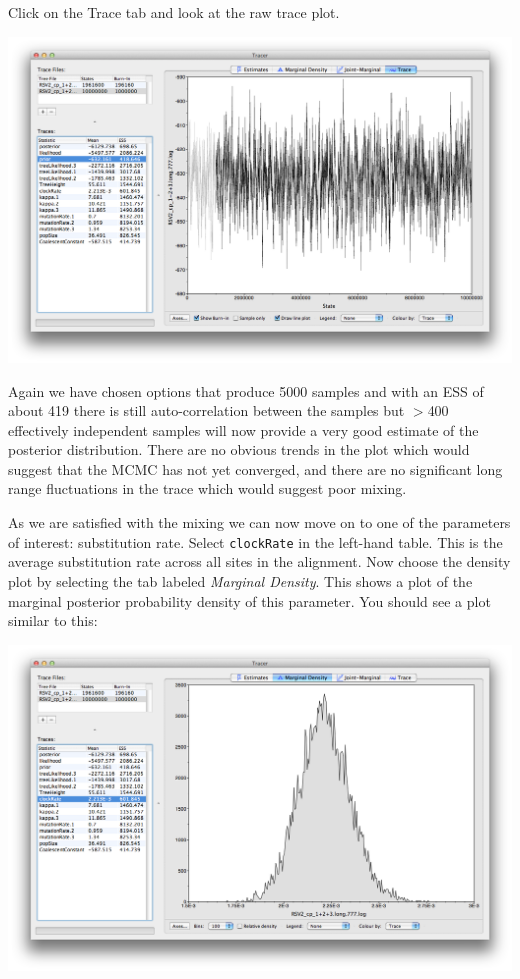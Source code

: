 \documentclass[12pt]{article}
\begin{document}
Click on the Trace tab and look at the raw trace plot.

\medskip{}

\includegraphics[width=\textwidth]{figures/Tracer2}

\medskip{}

Again we have chosen options that produce 5000 samples and with an ESS of about 419 there is still auto-correlation
between the samples but $>$400 effectively independent samples will now provide a very good estimate of the posterior distribution.
There are no obvious trends in the plot which would suggest that the MCMC has not yet converged, and there are no significant long range 
fluctuations in the trace which would suggest poor mixing.

As we are satisfied with the mixing we can now move on to one of the parameters of interest:
substitution rate. Select \texttt{clockRate} in the left-hand table. This is the average substitution rate across all sites in the
alignment. Now choose the density plot by selecting the tab labeled {\it Marginal Density}. This shows a plot of the marginal posterior probability
density of this parameter. You should see a plot similar to this:

\medskip{}

\includegraphics[width=\textwidth]{figures/Tracer_density}
\end{document}
